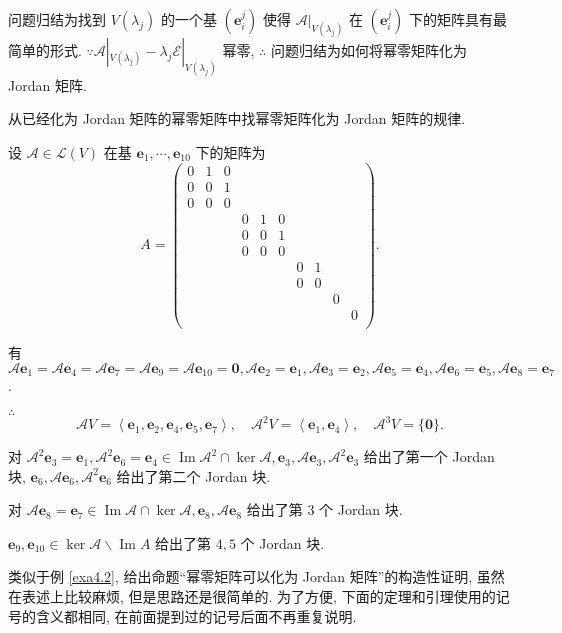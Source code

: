 \documentclass{ctexart}
\begin{document}
问题归结为找到 $V(\lambda_j)$ 的一个基 $(\boldsymbol{e}^j_i)$ 使得 $\mathcal{A}|_{V(\lambda_j)}$ 在 $(\boldsymbol{e}^j_i)$ 下的矩阵具有最简单的形式. $\because\mathcal{A}|_{V(\lambda_j)}-\lambda_j\mathcal{E}|_{V(\lambda_j)}$ 幂零, $\therefore$ 问题归结为如何将幂零矩阵化为 Jordan 矩阵.

从已经化为 Jordan 矩阵的幂零矩阵中找幂零矩阵化为 Jordan 矩阵的规律.
\begin{example}\label{exa4.2}
    设 $\mathcal{A}\in\mathcal{L}(V)$ 在基 $\boldsymbol{e}_1,\cdots,\boldsymbol{e}_{10}$ 下的矩阵为
    \[A=\begin{pmatrix}
        0 & 1 & 0 \\
        0 & 0 & 1 \\
        0 & 0 & 0 \\
        &&& 0 & 1 & 0 \\
        &&& 0 & 0 & 1 \\
        &&& 0 & 0 & 0 \\
        &&&&&& 0 & 1 \\
        &&&&&& 0 & 0 \\
        &&&&&&&& 0 \\
        &&&&&&&&& 0 \\
    \end{pmatrix}.\]

    有 $\mathcal{A}\boldsymbol{e}_1=\mathcal{A}\boldsymbol{e}_4=\mathcal{A}\boldsymbol{e}_7=\mathcal{A}\boldsymbol{e}_9=\mathcal{A}\boldsymbol{e}_{10}=\boldsymbol{0},\mathcal{A}\boldsymbol{e}_2=\boldsymbol{e}_1,\mathcal{A}\boldsymbol{e}_3=\boldsymbol{e}_2,\mathcal{A}\boldsymbol{e}_5=\boldsymbol{e}_4,\mathcal{A}\boldsymbol{e}_6=\boldsymbol{e}_5,\mathcal{A}\boldsymbol{e}_8=\boldsymbol{e}_7$.

    $\therefore$
    \[\mathcal{A}V=\left<\boldsymbol{e}_1,\boldsymbol{e}_2,\boldsymbol{e}_4,\boldsymbol{e}_5,\boldsymbol{e}_7\right>,\quad\mathcal{A}^2V=\left<\boldsymbol{e}_1,\boldsymbol{e}_4\right>,\quad\mathcal{A}^3V=\{\boldsymbol{0}\}.\]

    对 $\mathcal{A}^2\boldsymbol{e}_3=\boldsymbol{e}_1,\mathcal{A}^2\boldsymbol{e}_6=\boldsymbol{e}_4\in\operatorname{Im}\mathcal{A}^2\cap\ker\mathcal{A},\boldsymbol{e}_3,\mathcal{A}\boldsymbol{e}_3,\mathcal{A}^2\boldsymbol{e}_3$ 给出了第一个 Jordan 块, $\boldsymbol{e}_6,\mathcal{A}\boldsymbol{e}_6,\mathcal{A}^2\boldsymbol{e}_6$ 给出了第二个 Jordan 块.

    对 $\mathcal{A}\boldsymbol{e}_8=\boldsymbol{e}_7\in\operatorname{Im}\mathcal{A}\cap\ker\mathcal{A},\boldsymbol{e}_8,\mathcal{A}\boldsymbol{e}_8$ 给出了第 $3$ 个 Jordan 块.

    $\boldsymbol{e}_9,\boldsymbol{e}_{10}\in\ker\mathcal{A}\backslash\operatorname{Im}A$ 给出了第 $4,5$ 个 Jordan 块.
\end{example}
类似于例 \ref{exa4.2}, 给出命题``幂零矩阵可以化为 Jordan 矩阵''的构造性证明, 虽然在表述上比较麻烦, 但是思路还是很简单的. 为了方便, 下面的定理和引理使用的记号的含义都相同, 在前面提到过的记号后面不再重复说明.
\end{document}
